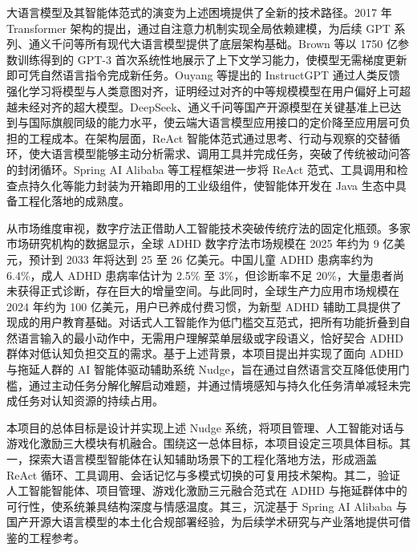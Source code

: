 \par 大语言模型及其智能体范式的演变为上述困境提供了全新的技术路径。2017 年 Transformer 架构的提出，通过自注意力机制实现全局依赖建模，为后续 GPT 系列、通义千问等所有现代大语言模型提供了底层架构基础\cite{vaswani2017attention}。Brown 等以 1750 亿参数训练得到的 GPT-3 首次系统性地展示了上下文学习能力，使模型无需梯度更新即可凭自然语言指令完成新任务\cite{brown2020gpt3}。Ouyang 等提出的 InstructGPT 通过人类反馈强化学习将模型与人类意图对齐，证明经过对齐的中等规模模型在用户偏好上可超越未经对齐的超大模型\cite{ouyang2022instructgpt}。DeepSeek、通义千问等国产开源模型在关键基准上已达到与国际旗舰同级的能力水平，使云端大语言模型应用接口的定价降至应用层可负担的工程成本。在架构层面，ReAct 智能体范式通过思考、行动与观察的交替循环，使大语言模型能够主动分析需求、调用工具并完成任务，突破了传统被动问答的封闭循环\cite{yao2022react}。Spring AI Alibaba 等工程框架进一步将 ReAct 范式、工具调用和检查点持久化等能力封装为开箱即用的工业级组件，使智能体开发在 Java 生态中具备工程化落地的成熟度\cite{spring_ai_alibaba}。

\par 从市场维度审视，数字疗法正借助人工智能技术突破传统疗法的固定化瓶颈。多家市场研究机构的数据显示，全球 ADHD 数字疗法市场规模在 2025 年约为 9 亿美元，预计到 2033 年将达到 25 至 26 亿美元\cite{adhdmarket2025}。中国儿童 ADHD 患病率约为 6.4\%，成人 ADHD 患病率估计为 2.5\% 至 3\%，但诊断率不足 20\%，大量患者尚未获得正式诊断，存在巨大的增量空间\cite{chinaburden2025}。与此同时，全球生产力应用市场规模在 2024 年约为 100 亿美元，用户已养成付费习惯，为新型 ADHD 辅助工具提供了现成的用户教育基础\cite{productivitymarket2025}。对话式人工智能作为低门槛交互范式，把所有功能折叠到自然语言输入的最小动作中，无需用户理解菜单层级或字段语义，恰好契合 ADHD 群体对低认知负担交互的需求。基于上述背景，本项目提出并实现了面向 ADHD 与拖延人群的 AI 智能体驱动辅助系统 Nudge，旨在通过自然语言交互降低使用门槛，通过主动任务分解化解启动难题，并通过情境感知与持久化任务清单减轻未完成任务对认知资源的持续占用。

\par 本项目的总体目标是设计并实现上述 Nudge 系统，将项目管理、人工智能对话与游戏化激励三大模块有机融合。围绕这一总体目标，本项目设定三项具体目标。其一，探索大语言模型智能体在认知辅助场景下的工程化落地方法，形成涵盖 ReAct 循环、工具调用、会话记忆与多模式切换的可复用技术架构。其二，验证人工智能智能体、项目管理、游戏化激励三元融合范式在 ADHD 与拖延群体中的可行性，使系统兼具结构深度与情感温度。其三，沉淀基于 Spring AI Alibaba 与国产开源大语言模型的本土化合规部署经验，为后续学术研究与产业落地提供可借鉴的工程参考。

